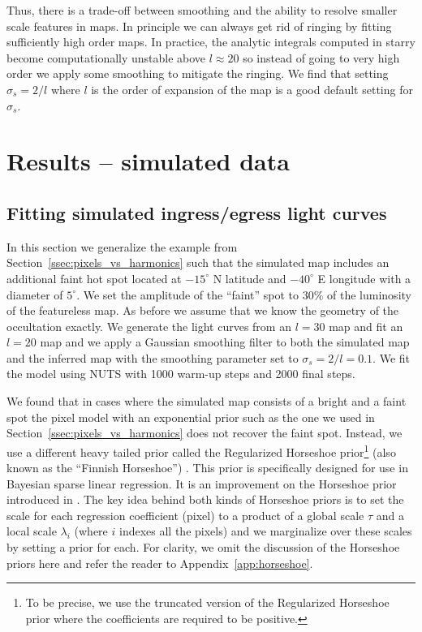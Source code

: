 \documentclass[modern]{aastex62}
\begin{document}
Thus, there is a trade-off between smoothing and the ability to resolve smaller scale features
in maps. 
In principle we can always get rid of ringing by fitting sufficiently high order maps.
In practice, the analytic integrals computed in \textsf{starry} become computationally unstable above $l\approx 20$ so instead of going to very high order we apply some smoothing to mitigate the ringing.
We find that setting $\sigma_s=2/l$ where $l$ is the order of expansion of the map  is a good default setting for $\sigma_s$.

\section{Results -- simulated data}
\label{sec:results_sim}
\subsection{Fitting simulated ingress/egress light curves}
\label{ssec:fitting_sim_ingress_egress}
In this section we generalize the example from Section~\ref{ssec:pixels_vs_harmonics} such that the simulated map includes an additional faint hot spot located at $-15^\circ$ N latitude and $-40^\circ$ E longitude with a diameter of $5^\circ$.
We set the amplitude of the ``faint'' spot to 30\% of the luminosity of the featureless map.
As before we assume that we know the geometry of the occultation exactly.
We generate the light curves from an $l=30$ map and fit an $l=20$ map and we apply a Gaussian smoothing filter to both the simulated map and the inferred map with the smoothing parameter set to $\sigma_s=2/l=0.1$.
We fit the model using NUTS with 1000 warm-up steps and 2000 final steps. 

We found that in cases where the simulated map consists of a bright and a faint spot the pixel model with an exponential prior such as the one we used in Section~\ref{ssec:pixels_vs_harmonics} does not recover the faint spot. 
Instead, we use a different heavy tailed prior called the Regularized Horseshoe prior\footnote{To be precise, we use the truncated version of the Regularized Horseshoe prior where the coefficients are required to be positive.} (also known as the ``Finnish Horseshoe'') \citep{piironen2017}.
This prior is specifically designed for use in Bayesian sparse linear regression. 
It is an improvement on the Horseshoe prior introduced in \cite{carvalho2010a}.
The key idea behind both kinds of Horseshoe priors is to set the scale for each regression coefficient (pixel) to a product of a global scale $\tau$ and a local scale $\lambda_i$ (where $i$ indexes all the pixels) and we marginalize over these scales by setting a prior for each. 
For clarity, we omit the discussion of  the Horseshoe priors here and refer the reader to Appendix~\ref{app:horseshoe}.
\end{document}

